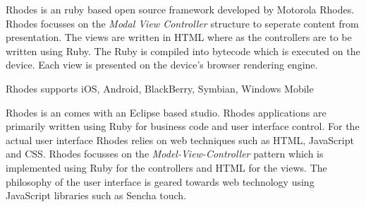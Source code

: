 \newpage

Rhodes is an ruby based open source framework developed by Motorola Rhodes. Rhodes focusses on the \emph{Modal View Controller} structure to seperate content from presentation. The views are written in HTML where as the controllers are to be written using Ruby. The Ruby is compiled into bytecode which is executed on the device. Each view is presented on the device’s browser rendering engine.

Rhodes supports iOS, Android, BlackBerry, Symbian, Windows Mobile

Rhodes is an comes with an Eclipse based studio. Rhodes applications are primarily written using Ruby for business code and user interface control. For the actual user interface Rhodes relies on web techniques such as HTML, JavaScript and CSS. 
Rhodes focusses on the \emph{Model-View-Controller} pattern which is implemented using Ruby for the controllers and HTML for the views. The philosophy of the user interface is geared towards web technology using JavaScript libraries such as Sencha touch.

